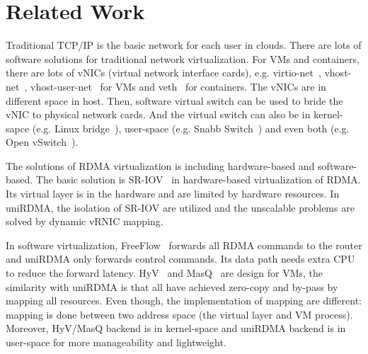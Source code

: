 \section{Related Work}

Traditional TCP/IP is the basic network for each user in clouds. There are lots of software solutions for traditional network virtualization. For VMs and containers, there are lots of vNICs (virtual network interface cards), e.g. virtio-net~\cite{virtio-russell2008}, vhost-net~\cite{vhost-net},  vhost-user-net~\cite{vhost-user-net} for VMs and veth~\cite{veth} for containers. The vNICs are in different space in host. Then, software virtual switch can be used to bride the vNIC to physical network cards. And the virtual switch can also be in kernel-sapce (e.g. Linux bridge~\cite{linux-bridge}), user-space (e.g. Snabb Switch~\cite{snabb}) and even both (e.g. Open vSwitch~\cite{ovs-2015}).  

The solutions of RDMA virtualization is including hardware-based and software-based. The basic solution is SR-IOV~\cite{sr-iov} in hardware-based virtualization of RDMA. Its virtual layer is in the hardware and are limited by hardware resources. In uniRDMA, the isolation of SR-IOV are utilized and the unscalable problems are solved by dynamic vRNIC mapping. 

In software virtualization, FreeFlow~\cite{kim2019freeflow} forwards all RDMA commands to the router and uniRDMA only forwards control commands. Its data path needs extra CPU to reduce the forward latency. HyV~\cite{pfefferle2015hybrid} and MasQ~\cite{he2020masq} are design for VMs, the similarity with uniRDMA is that all have achieved zero-copy and by-pass by mapping all resources. Even though, the implementation of mapping are different: mapping is done between two address space (the virtual layer and VM process). Moreover, HyV/MasQ backend is in kernel-space and uniRDMA backend is in user-space for more manageability and lightweight.